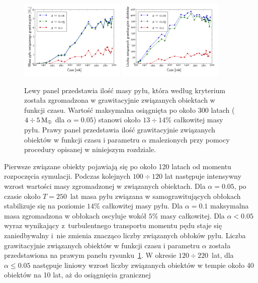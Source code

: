 \begin{figure}[ht]
  \centering
  \includegraphics[width=0.45\textwidth]{figures/bmass_vs_time}
  \includegraphics[width=0.45\textwidth]{figures/nclumps_vs_time}
  \caption{Lewy panel przedstawia ilość masy pyłu, która według
     kryterium~ została zgromadzona w grawitacyjnie związanych
     obiektach w funkcji czasu. Wartość maksymalna osiągnięta po około 300
     latach ($4\div5\hbox{$\mathrm{\thinspace M_{\oplus}}$}$ dla $\alpha = 0.05$) stanowi około $13\div14\%$
     całkowitej masy pyłu. Prawy panel przedstawia ilość grawitacyjnie
     związanych obiektów w funkcji czasu i parametru $\alpha$ znalezionych przy
     pomocy procedury opisanej w niniejszym rozdziale.}
  \label{fig:bmasstime} 
\end{figure}
%
Pierwsze związane obiekty pojawiają się po około 120 latach od momentu
rozpoczęcia symulacji. Podczas kolejnych $100\div120$ lat następuje intensywny
wzrost wartości masy zgromadzonej w związanych obiektach. Dla $\alpha = 0.05$,
po czasie około $T = 250$~lat masa pyłu związana w samograwitujących obłokach
stabilizuje się na poziomie $14\%$ całkowitej masy pyłu. Dla $\alpha = 0.1$
maksymalna masa zgromadzona w obłokach oscyluje wokół $5\%$ masy całkowitej. Dla
$\alpha < 0.05$ wyraz wynikający z~turbulentnego transportu momentu pędu staje
się zaniedbywalny i~nie zmienia znacząco liczby związanych obłoków pyłu. Liczba
grawitacyjnie związanych obiektów w funkcji czasu i parametru $\alpha$ została
przedstawiona na prawym panelu rysunku~\ref{fig:bmasstime}. W okresie $120 \div
220$~lat, dla $\alpha \leq 0.05$ następuje liniowy wzrost liczby związanych
obiektów w tempie około 40 obiektów na 10 lat, aż do osiągnięcia granicznej
